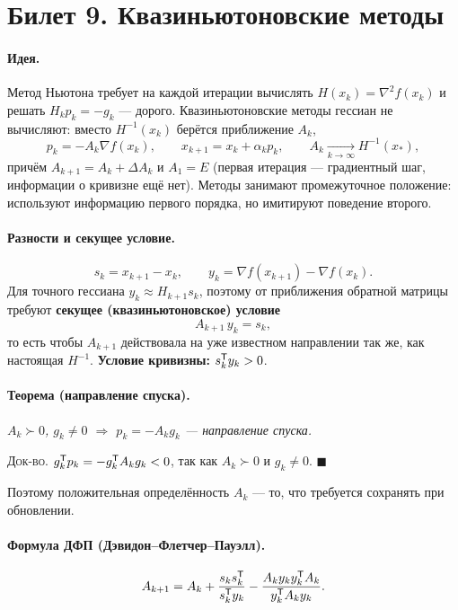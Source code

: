 \section{Билет 9. Квазиньютоновские методы}


\paragraph{Идея.}
Метод Ньютона требует на каждой итерации вычислять $H(x_k) = \nabla^2 f(x_k)$ и
решать $H_k p_k = -g_k$ — дорого. Квазиньютоновские методы гессиан не
вычисляют: вместо $H^{-1}(x_k)$ берётся приближение $A_k$,
\[
  p_k = -A_k \nabla f(x_k) ,
  \qquad
  x_{k+1} = x_k + \alpha_k p_k ,
  \qquad
  A_k \xrightarrow[k\to\infty]{} H^{-1}(x_*) ,
\]
причём $A_{k+1} = A_k + \Delta A_k$ и $A_1 = E$ (первая итерация —
градиентный шаг, информации о кривизне ещё нет). Методы занимают промежуточное
положение: используют информацию первого порядка, но имитируют поведение
второго.

\paragraph{Разности и секущее условие.}
\[
  s_k = x_{k+1} - x_k , \qquad
  y_k = \nabla f(x_{k+1}) - \nabla f(x_k) .
\]
Для точного гессиана $y_k \approx H_{k+1}s_k$, поэтому от приближения обратной
матрицы требуют \textbf{секущее (квазиньютоновское) условие}
\[
  A_{k+1}\,y_k = s_k ,
\]
то есть чтобы $A_{k+1}$ действовала на уже известном направлении так же, как
настоящая $H^{-1}$. \textbf{Условие кривизны:} $s_k^{\mathsf{T}} y_k > 0$.

\paragraph{Теорема (направление спуска).}
\textit{$A_k \succ 0$, $g_k \ne 0$ $\Rightarrow$ $p_k = -A_k g_k$ —
направление спуска.}

\textsc{Док-во.} $g_k^{\mathsf{T}} p_k = -g_k^{\mathsf{T}} A_k g_k < 0$, так как $A_k \succ 0$ и
$g_k \ne 0$. $\blacksquare$

Поэтому положительная определённость $A_k$ — то, что требуется сохранять при
обновлении.

\paragraph{Формула ДФП (Дэвидон--Флетчер--Пауэлл).}
\[
  A_{k+1} = A_k + \frac{s_k s_k^{\mathsf{T}}}{s_k^{\mathsf{T}} y_k}
            - \frac{A_k y_k y_k^{\mathsf{T}} A_k}{y_k^{\mathsf{T}} A_k y_k} .
\]

